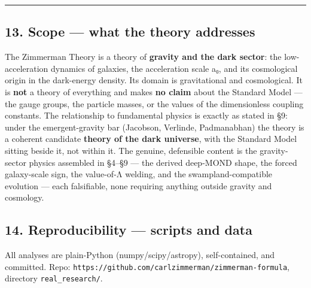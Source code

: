 \documentclass[
]{article}
\newcounter{none} %
\begin{document}
\begin{center}\rule{0.5\linewidth}{0.5pt}\end{center}

\subsection{13. Scope --- what the theory
addresses}\label{scope-what-the-theory-addresses}

The Zimmerman Theory is a theory of \textbf{gravity and the dark
sector}: the low-acceleration dynamics of galaxies, the acceleration
scale a₀, and its cosmological origin in the dark-energy density. Its
domain is gravitational and cosmological. It is \textbf{not} a theory of
everything and makes \textbf{no claim} about the Standard Model --- the
gauge groups, the particle masses, or the values of the dimensionless
coupling constants. The relationship to fundamental physics is exactly
as stated in §9: under the emergent-gravity bar (Jacobson, Verlinde,
Padmanabhan) the theory is a coherent candidate \textbf{theory of the
dark universe}, with the Standard Model sitting beside it, not within
it. The genuine, defensible content is the gravity-sector physics
assembled in §4--§9 --- the derived deep-MOND shape, the forced
galaxy-scale sign, the value-of-Λ welding, and the swampland-compatible
evolution --- each falsifiable, none requiring anything outside gravity
and cosmology.

\subsection{14. Reproducibility --- scripts and
data}\label{reproducibility-scripts-and-data}

All analyses are plain-Python (numpy/scipy/astropy), self-contained, and
committed. Repo:
\texttt{https://github.com/carlzimmerman/zimmerman-formula}, directory
\texttt{real\_research/}.
\end{document}
